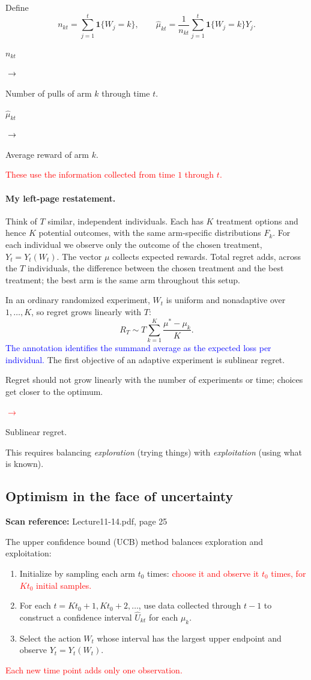 \documentclass[11pt,a4paper]{article}
\newcommand{\sourcepages}[1]{\par{\small\sffamily\color{muted}\textbf{Scan reference:} #1\par}\nobreak\smallskip\nopagebreak[4]}
\newcommand{\inkblue}[1]{\textcolor{blue}{#1}}
\newcommand{\inkred}[1]{\textcolor{red}{#1}}
\newcommand{\notearrow}[3]{%
\par\Needspace{6\baselineskip}\smallskip
\noindent\begin{minipage}[c]{0.43\linewidth}\raggedright\color{#1}#2\end{minipage}%
\hfill\textcolor{#1}{\(\longrightarrow\)}\hfill%
\begin{minipage}[c]{0.43\linewidth}\raggedright#3\end{minipage}\par\smallskip}
\begin{document}
Define
\[
 n_{kt}=\sum_{j=1}^t\mathbf1\{W_j=k\},\qquad
 \widehat\mu_{kt}=\frac1{n_{kt}}\sum_{j=1}^t\mathbf1\{W_j=k\}Y_j.
\]
\notearrow{black}{$n_{kt}$}{Number of pulls of arm $k$ through time $t$.}
\notearrow{black}{$\widehat\mu_{kt}$}{Average reward of arm $k$.}
\inkred{These use the information collected from time $1$ through $t$.}

\paragraph{My left-page restatement.}
Think of $T$ similar, independent individuals. Each has $K$ treatment options and hence $K$ potential outcomes, with the same arm-specific distributions $F_k$. For each individual we observe only the outcome of the chosen treatment, $Y_t=Y_t(W_t)$. The vector $\mu$ collects expected rewards. Total regret adds, across the $T$ individuals, the difference between the chosen treatment and the best treatment; the best arm is the same arm throughout this setup.

In an ordinary randomized experiment, $W_t$ is uniform and nonadaptive over $1,\ldots,K$, so regret grows linearly with $T$:
\[
 R_T\sim T\sum_{k=1}^K\frac{\mu^*-\mu_k}{K}.
\]
\inkblue{The annotation identifies the summand average as the expected loss per individual.} The first objective of an adaptive experiment is sublinear regret. \notearrow{red}{Regret should not grow linearly with the number of experiments or time; choices get closer to the optimum.}{Sublinear regret.} This requires balancing \emph{exploration} (trying things) with \emph{exploitation} (using what is known).

\subsection{Optimism in the face of uncertainty}
\sourcepages{Lecture11-14.pdf, page 25}
The upper confidence bound (UCB) method balances exploration and exploitation:
\begin{enumerate}
 \item Initialize by sampling each arm $t_0$ times: \inkred{choose it and observe it $t_0$ times, for $Kt_0$ initial samples.}
 \item For each $t=Kt_0+1,Kt_0+2,\ldots$, use data collected through $t-1$ to construct a confidence interval $\widehat U_{kt}$ for each $\mu_k$.
 \item Select the action $W_t$ whose interval has the largest upper endpoint and observe $Y_t=Y_t(W_t)$.
\end{enumerate}
\inkred{Each new time point adds only one observation.}
\end{document}
